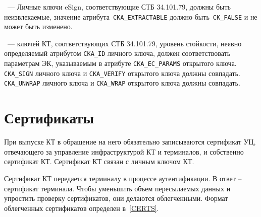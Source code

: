 \begin{note}
~---
Личные ключи eSign, соответствующие СТБ 34.101.79, должны быть неизвлекаемые,
значение атрибута~\verb|CKA_EXTRACTABLE| должно быть~\verb|CK_FALSE| и
не может быть изменено.
\end{note}

\begin{note}
~---
 ключей КТ, соответствующих СТБ 34.101.79,
уровень стойкости, неявно определяемый атрибутом \verb|CKA_ID| личного ключа,
должен соответствовать параметрам ЭК, указываемым в атрибуте 
\verb|CKA_EC_PARAMS| открытого ключа.  
\verb|CKA_SIGN| личного ключа и \verb|CKA_VERIFY| открытого ключа должны 
совпадать.  \verb|CKA_UNWRAP| личного ключа и 
\verb|CKA_WRAP| открытого ключа должны совпадать. 
\end{note}


\fi 

\section{Сертификаты}\label{OBJ.Certs}

При выпуске КТ в обращение на него обязательно записываются сертификат 
УЦ, отвечающего за управление инфраструктурой КТ и терминалов,
и собственно сертификат КТ. Сертификат КТ связан с личным ключом КТ. 

Сертификат КТ передается терминалу в процессе аутентификации. 
В ответ -- сертификат терминала. Чтобы уменьшить объем пересылаемых 
данных и упростить проверку сертификатов, они делаются облегченными.
Формат облегченных сертификатов определен в~\ref{CERTS}.


